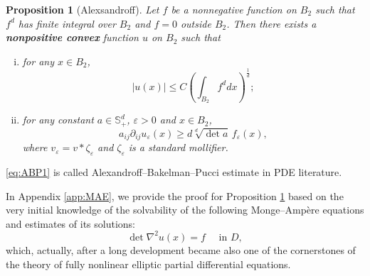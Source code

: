 \documentclass[twoside, 12pt]{book}
\numberwithin{equation}{chapter}
\newtheorem{proposition}[theorem]{Proposition}
\def\mS{{\mathbb S}}
\def\geq{\geqslant}
\def\leq{\leqslant}
\def\p{\partial}
\def\eps{\varepsilon}
\begin{document}
 
	\begin{proposition}[Alexsandroff]\label{Prop-ABP}
		Let $f$ be a nonnegative function on $B_2$ such that $f^d$ has finite integral over $B_2$ and $f=0$ outside $B_2$. Then there exists a {\bf nonpositive  convex} function $u$ on $B_2$ such that
		\begin{enumerate}[(i)]
			\item  for any $x\in B_2$, 
			\begin{equation}\label{eq:ABP1}
				|u(x)| \leq C \left(\int_{B_2} f^d d x\right)^{\frac{1}{d}}; 
			\end{equation}
			\item for any constant $a\in \mS^d_+$, $\eps>0$ and $x\in B_2$, 
			\begin{equation}
				a_{ij}\p_{ij} u_{\eps}(x)\geq d \sqrt[d]{\det a} \, f_{\eps}(x), 
			\end{equation}
			where $v_\eps= v*\zeta_\eps$ and $\zeta_\eps$ is a standard mollifier. 
		\end{enumerate}
	\end{proposition}
	\eqref{eq:ABP1} is called Alexandroff–Bakelman–Pucci estimate in PDE literature. 
	
	\medspace
	
	In Appendix \ref{app:MAE}, we provide the proof for Proposition \ref{Prop-ABP} based on the very initial knowledge of the solvability of the following Monge–Ampère equations and estimates of its solutions: 
	\begin{equation}\label{eq:MAE}
		\det \nabla^2 u(x)=f\quad \mbox{ in } D, 
	\end{equation}
	which, actually, after a long development became also one of the cornerstones of the theory of fully nonlinear elliptic partial differential equations. 
	
\end{document}

